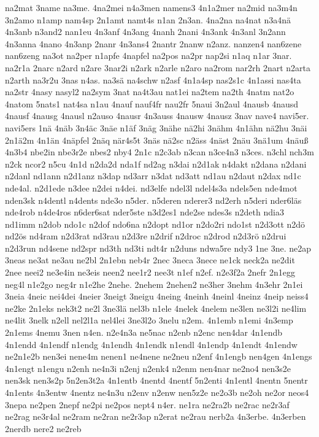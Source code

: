 {na2mat
3name
na3me.
4na2mei
n4a3men
namens3
4n1a2mer
na2mid
na3m4n
3n2amo
n1amp
nam4sp
2n1amt
namt4s
n1an
2n3an.
4na2na
na4nat
n3a4nä
4n3anb
n3and2
nan1eu
4n3anf
4n3ang
4nanh
2nani
4n3ank
4n3anl
3n2ann
4n3anna
4nano
4n3anp
2nanr
4n3ans4
2nantr
2nanw
n2anz.
nanzen4
nan6zene
nan6zeng
na3ot
na2per
n1apfe
4napfel
na2pos
na2pr
nap2si
n1aq
n1ar
3nar.
na2r1a
2narc
n2ard
n2are
3nar2i
n2ark
n2arle
n2aro
na2rom
nar2rh
2nart
n2arta
n2arth
na3r2u
3nas
n4as.
na3sä
na4schw
n2asf
4n1a4sp
nas2s1c
4n1assi
nas4ta
na2str
4nasy
nasyl2
na2sym
3nat
na4t3au
nat1ei
na2tem
na2th
4natm
nat2o
4natom
5nats1
nat4sa
n1au
4nauf
nauf4fr
nau2fr
5naui
3n2aul
4nausb
4nausd
4nausf
4nausg
4nausl
n2auso
4nausr
4n3auss
4nausw
4nausz
3nav
nave4
navi5er.
navi5ers
1nä
4näb
3n4äc
3näe
n1äf
3näg
3nähe
nä2hi
3nähm
4n1ähn
nä2hu
3näi
2n1ä2m
4n1än
4näpfel
2näq
när4s5t
3näs
nä2sc
n2äss
4näst
2näu
3nä1um
4näuß
4n3b4
nbe2in
nbe3r2e
nbes2
nby4
2n1c
n2c3ab
n3can
n3ce4n3
n3ces.
n3chl
nch3m
n2ck
ncor2
n5cu
4n1d
n2da2d
nda1f
nd2ag
n3dai
n2d1ak
n4dakt
n2dana
n2dani
n2danl
nd1ann
n2d1anz
n3dap
nd3arr
n3dat
nd3att
nd1au
n2daut
n2dax
nd1c
nde4al.
n2d1ede
n3dee
n2dei
n4dei.
nd3elfe
ndel3l
ndel4s3a
ndels5en
nde4mot
nden3sk
n4dentl
n4dents
nde3o
n5der.
n5deren
nderer3
nd2erh
n5deri
nder6läs
nde4rob
n4de4ros
n6der6sat
nder5ste
n3d2es1
nde2se
ndes3s
n2deth
ndia3
nd1imm
n2dob
ndo1c
n2dof
ndo6na
n2dopt
nd1or
n2do2ri
ndo1st
n2d3ott
n2dö
nd2ös
nd4ram
n2d3rat
nd3rau
n2d3re
n2drif
n2droc
n2drod
n2d3rö
n2drui
n2d3run
nd4sene
nd2spr
nd3th
nd3ti
ndt4r
n2duns
ndwa5re
ndy3
1ne
3ne.
ne2ap
3neas
ne3at
ne3au
ne2bl
2n1ebn
neb4r
2nec
3neca
3nece
ne1ck
neck2a
ne2dit
2nee
neei2
ne3e4in
ne3eis
neen2
nee1r2
nee3t
n1ef
n2ef.
n2e3f2a
2nefr
2n1egg
neg4l
n1e2go
neg4r
n1e2he
2nehe.
2nehem
2nehen2
ne3her
3nehm
4n3ehr
2n1ei
3neia
4neic
nei4dei
4neier
3neigt
3neigu
4neing
4neinh
4neinl
4neinz
4neip
neiss4
ne2ke
2n1eks
nek3t2
ne2l
3ne3lä
nel3b
n1ele
4nelek
4nelem
ne3len
ne3l2i
ne4lim
ne4lit
3nelk
n2ell
nel2l1a
nel4lei
3ne3l2o
3nelu
n2em.
4n1emb
n1emi
4n3emp
2n1ems
4nemu
3nen
n4en.
n2e4n3a
ne5nac
n2enb
n2enc
nen4dar
4n1endb
4n1endd
4n1endf
n1endg
4n1endh
4n1endk
n1endl
4n1endp
4n1endt
4n1endw
ne2n1e2b
nen3ei
nene4m
nenen1
ne4nene
ne2neu
n2enf
4n1engb
nen4gen
4n1engs
4n1engt
n1engu
n2enh
ne4n3i
n2enj
n2enk4
n2enm
nen4nar
ne2no4
nen3s2e
nen3sk
nen3s2p
5n2en3t2a
4n1entb
4nentd
4nentf
5n2enti
4n1entl
4nentn
5nentr
4n1ents
4n3entw
4nentz
ne4n3u
n2env
n2enw
nen5z2e
ne2o3b
ne2oh
ne2or
neos4
3nepa
ne2pen
2nepf
ne2pi
ne2pos
nept4
n4er.
ne1ra
ne2ra2b
ne2rac
ne2r3af
ne2rag
ne3r4al
ne2ram
ne2ran
ne2r3ap
n2erat
ne2rau
nerb2a
4n3erbe.
4n3erben
2nerdb
nere2
ne2reb
}
